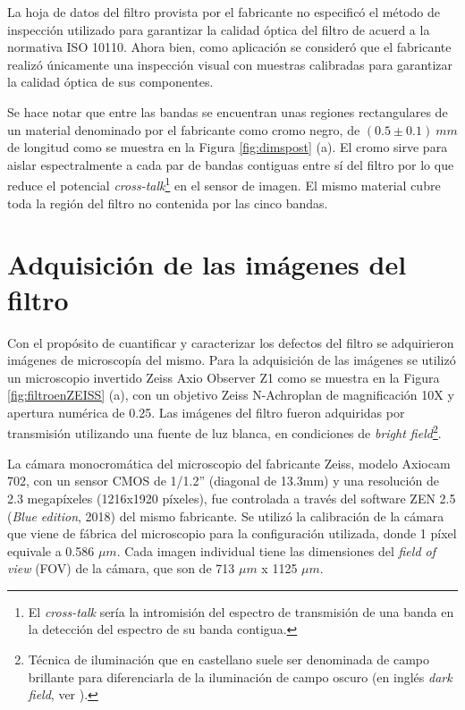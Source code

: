 La hoja de datos del filtro provista por el fabricante no especificó el método de inspección utilizado para garantizar la calidad óptica del filtro de acuerd a la normativa ISO 10110. Ahora bien, como aplicación se consideró que el fabricante realizó únicamente una inspección visual con muestras calibradas para garantizar la calidad óptica de sus componentes.

Se hace notar que entre las bandas se encuentran unas regiones rectangulares de un material denominado por el fabricante como cromo negro, de $(0.5 \pm 0.1)~mm $ de longitud como se muestra en la Figura \ref{fig:dimspost} (a). El cromo sirve para aislar espectralmente a cada par de bandas contiguas entre sí del filtro por lo que reduce el potencial \textit{cross-talk}\footnote{El \textit{cross-talk} sería la intromisión del espectro de transmisión de una banda en la detección del espectro de su banda contigua.} en el sensor de imagen. El mismo material cubre toda la región del filtro no contenida por las cinco bandas. 

\singlespacing
\section{Adquisición de las imágenes del filtro}
\label{sec:conf}

\hspace{0.5cm}Con el propósito de cuantificar y caracterizar los defectos del filtro se adquirieron imágenes de microscopía del mismo. Para la adquisición de las imágenes se utilizó un microscopio invertido Zeiss Axio Observer Z1 como se muestra en la Figura \ref{fig:filtroenZEISS} (a), con un objetivo Zeiss N-Achroplan de magnificación 10X y apertura numérica de 0.25. Las imágenes del filtro fueron adquiridas por transmisión utilizando una fuente de luz blanca, en condiciones de \textit{bright field}\footnote{Técnica de iluminación que en castellano suele ser denominada de campo brillante para diferenciarla de la iluminación de campo oscuro (en inglés \textit{dark field}, ver \cite{wikiosc}).}.

La cámara monocromática del microscopio del fabricante Zeiss, modelo Axiocam 702, con un sensor CMOS de 1/1.2'' (diagonal de 13.3mm) y una resolución de 2.3 megapíxeles (1216x1920 píxeles), fue controlada a través del software ZEN 2.5 (\textit{Blue edition}, 2018) del mismo fabricante. Se utilizó la calibración de la cámara que viene de fábrica del microscopio para la configuración utilizada, donde 1 píxel equivale a 0.586 $\mu m$.  Cada imagen individual tiene las dimensiones del \textit{field of view} (FOV) de la cámara, que son de 713 $\mu m$ x 1125 $\mu m$. 

